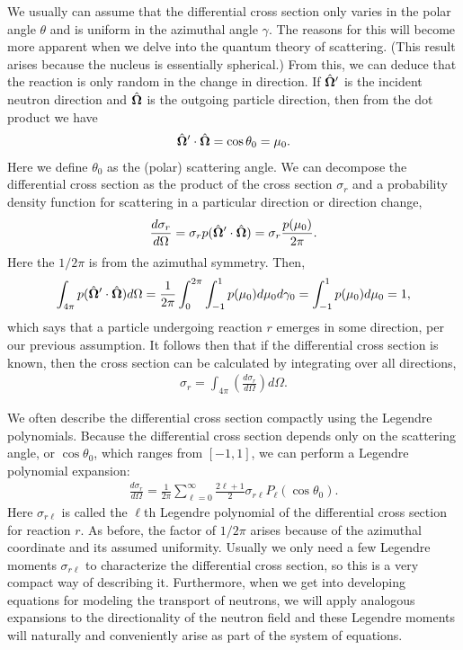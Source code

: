 We usually can assume that the differential cross section only varies in the polar angle $\theta$ and is uniform in the azimuthal angle $\gamma$. The reasons for this will become more apparent when we delve into the quantum theory of scattering. (This result arises because the nucleus is essentially spherical.)  From this, we can deduce that the reaction is only random in the change in direction. If $\hat{\mathbf{\Omega}}'$ is the incident neutron direction and $\hat{\mathbf{\Omega}}$ is the outgoing particle direction, then from the dot product we have
\begin{align}
  \hat{\mathbf{\Omega}}' \cdot \hat{\mathbf{\Omega}} = \cos\theta_0 = \mu_0. 
\end{align}
Here we define $\theta_0$ as the (polar) scattering angle. We can decompose the differential cross section as the product of the cross section $\sigma_r$ and a probability density function for scattering in a particular direction or direction change, 
\begin{align}
  \frac{d\sigma_r}{d\Omega} = \sigma_r p(\hat{\mathbf{\Omega}}' \cdot \hat{\mathbf{\Omega}}) = \sigma_r \frac{p(\mu_0)}{2\pi} . 
\end{align}
Here the $1/2\pi$ is from the azimuthal symmetry. Then,
\begin{align}
  \int_{4\pi} p(\hat{\mathbf{\Omega}}' \cdot \hat{\mathbf{\Omega}}) d\Omega 
  = \frac{1}{2\pi} \int_0^{2\pi} \int_{-1}^1 p(\mu_0) d\mu_0 d\gamma_0 
  = \int_{-1}^1 p(\mu_0) d\mu_0
  = 1,
\end{align}
which says that a particle undergoing reaction $r$ emerges in some direction, per our previous assumption. It follows then that if the differential cross section is known, then the cross section can be calculated by integrating over all directions,
\begin{align}
  \sigma_r = \int_{4\pi} \left( \frac{d\sigma_r}{d\Omega} \right) d\Omega .
\end{align}

We often describe the differential cross section compactly using the Legendre polynomials. Because the differential cross section depends only on the scattering angle, or $\cos\theta_0$, which ranges from $[-1,1]$, we can perform a Legendre polynomial expansion:
\begin{align}
   \frac{d\sigma_r}{d\Omega} = \frac{1}{2\pi} \sum_{\ell = 0}^\infty \frac{ 2\ell + 1 }{2} \sigma_{r\ell} P_\ell(\cos\theta_0) .
\end{align}
Here $\sigma_{r\ell}$ is called the $\ell$th Legendre polynomial of the differential cross section for reaction $r$. As before, the factor of $1/2\pi$ arises because of the azimuthal coordinate and its assumed uniformity. Usually we only need a few Legendre moments $\sigma_{r\ell}$ to characterize the differential cross section, so this is a very compact way of describing it. Furthermore, when we get into developing equations for modeling the transport of neutrons, we will apply analogous expansions to the directionality of the neutron field and these Legendre moments will naturally and conveniently arise as part of the system of equations.

